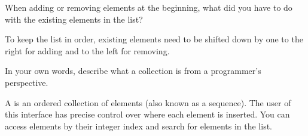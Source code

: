 \Q When adding or removing elements at the beginning, what did you have to do with the existing elements in the list?

\begin{answer}
To keep the list in order, existing elements need to be shifted down by one to the right for adding and to the left for removing.
\end{answer}


\Q \label{key1}
In your own words, describe what a  collection is from a programmer's perspective.

\begin{answer}[5em]
A  is an ordered collection of elements (also known as a sequence).
The user of this interface has precise control over where  each element is inserted.
You can access elements by their integer index and search for elements in the list.
\end{answer}
